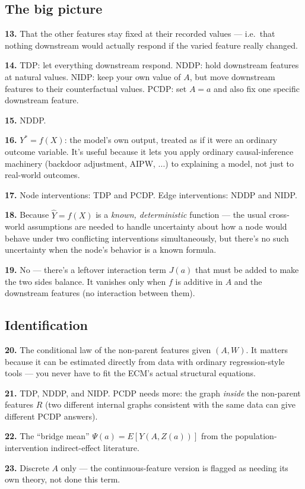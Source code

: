 \documentclass[11pt]{article}
\newcommand{\qa}[2]{\par\noindent\textbf{#1.} #2\par\smallskip}
\begin{document}
\subsection*{The big picture}
\qa{13}{That the other features stay fixed at their recorded values ---
  i.e.\ that nothing downstream would actually respond if the varied
  feature really changed.}
\qa{14}{TDP: let everything downstream respond. NDDP: hold downstream
  features at natural values. NIDP: keep your own value of $A$, but move
  downstream features to their counterfactual values. PCDP: set $A=a$ and
  also fix one specific downstream feature.}
\qa{15}{NDDP.}
\qa{16}{$Y^* = f(X)$: the model's own output, treated as if it were an
  ordinary outcome variable. It's useful because it lets you apply
  ordinary causal-inference machinery (backdoor adjustment, AIPW, ...) to
  explaining a model, not just to real-world outcomes.}
\qa{17}{Node interventions: TDP and PCDP. Edge interventions: NDDP and
  NIDP.}
\qa{18}{Because $\hat Y = f(X)$ is a \emph{known, deterministic} function
  --- the usual cross-world assumptions are needed to handle uncertainty
  about how a node would behave under two conflicting interventions
  simultaneously, but there's no such uncertainty when the node's behavior
  is a known formula.}
\qa{19}{No --- there's a leftover interaction term $J(a)$ that must be
  added to make the two sides balance. It vanishes only when $f$ is
  additive in $A$ and the downstream features (no interaction between
  them).}

\subsection*{Identification}
\qa{20}{The conditional law of the non-parent features given $(A,W)$. It
  matters because it can be estimated directly from data with ordinary
  regression-style tools --- you never have to fit the ECM's actual
  structural equations.}
\qa{21}{TDP, NDDP, and NIDP. PCDP needs more: the graph \emph{inside} the
  non-parent features $R$ (two different internal graphs consistent with
  the same data can give different PCDP answers).}
\qa{22}{The ``bridge mean'' $\Psi(a) = E[Y(A,Z(a))]$ from the
  population-intervention indirect-effect literature.}
\qa{23}{Discrete $A$ only --- the continuous-feature version is flagged as
  needing its own theory, not done this term.}
\end{document}
